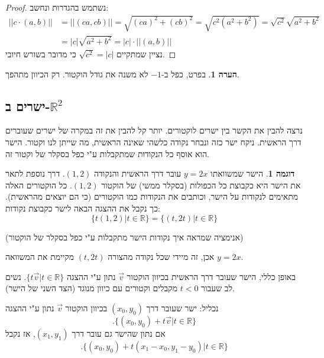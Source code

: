 \documentclass[12pt]{book}
\theoremstyle{plain}
\theoremstyle{definition}
\newtheorem{example}[theorem]{דוגמה}
\newtheorem{remark}[theorem]{הערה}
\newcommand{\R}{\mathbb{R}}
\begin{document}
\begin{proof}
נשתמש בהגדרות ונחשב:
\begin{align*}
||c\cdot(a,b)||&=||(ca,cb)||=\sqrt{(ca)^{2}+(cb)^{2}}=\sqrt{c^{2}(a^{2}+b^{2})}=\sqrt{c^2}\sqrt{a^2+b^2}\\
&=|c|\sqrt{a^{2}+b^{2}}=|c|\cdot||(a,b)||
\end{align*}
נציין שמתקיים \(\sqrt{c^2}=|c|\) כי מדובר בשורש חיובי.
\end{proof}

\begin{remark}
בפרט, כפל ב-\(-1\) לא משנה את גודל הוקטור. רק הכיוון מתהפך.
\end{remark}

\subsection{ישרים ב-\(\R^{2}\)}

נרצה להבין את הקשר בין ישרים לוקטורים. יותר קל להבין את זה במקרה של
ישרים שעוברים דרך הראשית. ניקח ישר כזה ונבחר נקודה כלשהי שאינה הראשית,
מה שייתן לנו וקטור. הישר הוא אוסף כל הנקודות שמתקבלות ע"י
כפל בסקלר של וקטור זה.

\begin{example}
הישר שמשוואתו \(y=2x\) עובר דרך הראשית והנקודה 
\((1,2)\).
דרך נוספת לתאר את הישר היא כקבוצת כל הכפולות (בסקלר ממשי) של הוקטור
\((1,2)\). כל הוקטורים האלה מתאימים לנקודות על הישר, וכותבים את הנקודות כמו הוקטורים (כי הם יוצאים מהראשית). כך נקבל את ההצגה הבאה לישר כקבוצת נקודות:
	\begin{equation*}
	\{t(1,2)|t\in\mathbb{R}\}=\{(t,2t)|t\in\mathbb{R}\}
	\end{equation*}
\end{example}

\begin{center}
	(אנימציה שמראה איך נקודות הישר מתקבלות ע"י כפל בסקלר
	של הוקטור)
\end{center}

אכן, זה מיידי שכל נקודה מהצורה \((t,2t)\) מקיימת את המשוואה \(y=2x\). 

באופן כללי, הישר שעובר דרך הראשית בכיוון הוקטור \(\vec{v}\) נתון
ע"י ההצגה \(\{t\vec{v}|t\in\R\}\). נשים לב
שעבור \(t<0\) מקבלים וקטורים עם כיוון מנוגד (הצד השני של הישר).

נכליל: ישר שעובר דרך \((x_{0},y_{0})\) בכיוון הוקטור \(\vec{v}\)
נתון ע"י ההצגה
\begin{equation*}
	 .\{(x_{0},y_{0})+t\vec{v}|t\in\mathbb{R}\}
\end{equation*}
אם נתון שהישר גם עובר דרך \((x_{1},y_{1})\), אז נקבל
\begin{equation*}
	.\{(x_{0},y_{0})+t(x_{1}-x_{0},y_{1}-y_{0})|t\in\mathbb{R}\}
\end{equation*}
\end{document}
